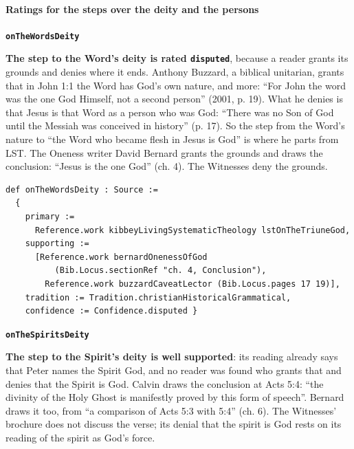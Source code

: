 \documentclass[11pt,paper=\testimonypaper,DIV=13,parskip=false]{scrartcl}
\begin{document}
\paragraph*{Ratings for the steps over the deity and the persons}
\leavevmode\par\nobreak
\par\medskip\noindent\textbf{\texttt{on\allowbreak{}The\allowbreak{}Words\allowbreak{}Deity}}\par\nobreak\noindent
\textbf{The step to the Word’s deity is rated \texttt{disputed}}, because a reader grants its grounds and denies where it ends. Anthony Buzzard, a biblical unitarian, grants that in John 1:1 the Word has God’s own nature, and more: “For John the word was the one God Himself, not a second person” (2001, p. 19). What he denies is that Jesus is that Word as a person who was God: “There was no Son of God until the Messiah was conceived in history” (p. 17). So the step from the Word’s nature to “the Word who became flesh in Jesus is God” is where he parts from LST. The Oneness writer David Bernard grants the grounds and draws the conclusion: “Jesus is the one God” (ch. 4). The Witnesses deny the grounds.

{\small\begin{verbatim}
def onTheWordsDeity : Source :=
  {
    primary :=
      Reference.work kibbeyLivingSystematicTheology lstOnTheTriuneGod,
    supporting :=
      [Reference.work bernardOnenessOfGod
          (Bib.Locus.sectionRef "ch. 4, Conclusion"),
        Reference.work buzzardCaveatLector (Bib.Locus.pages 17 19)],
    tradition := Tradition.christianHistoricalGrammatical,
    confidence := Confidence.disputed }
\end{verbatim}}
\par\medskip\noindent\textbf{\texttt{on\allowbreak{}The\allowbreak{}Spirits\allowbreak{}Deity}}\par\nobreak\noindent
\textbf{The step to the Spirit’s deity is well supported}: its reading already says that Peter names the Spirit God, and no reader was found who grants that and denies that the Spirit is God. Calvin draws the conclusion at Acts 5:4: “the divinity of the Holy Ghost is manifestly proved by this form of speech”. Bernard draws it too, from “a comparison of Acts 5:3 with 5:4” (ch. 6). The Witnesses’ brochure does not discuss the verse; its denial that the spirit is God rests on its reading of the spirit as God’s force.
\end{document}
